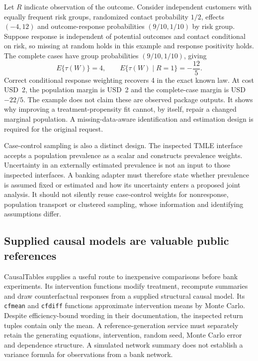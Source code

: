 Let $R$ indicate observation of the outcome. Consider independent customers
with equally frequent risk groups, randomized contact probability $1/2$,
effects $(-4,12)$ and outcome-response probabilities $(9/10,1/10)$ by risk
group. Suppose response is independent of potential outcomes and contact
conditional on risk, so missing at random holds in this example and response
positivity holds. The complete cases have group probabilities $(9/10,1/10)$,
giving
\begin{equation}
\label{exec21:effects-response}
 E\{\tau(W)\}=4,\qquad
 E\{\tau(W)\mid R=1\}=-\frac{12}{5}.
\end{equation}
Correct conditional response weighting recovers 4 in the exact known law.
At cost USD~2, the population margin is USD~2 and the complete-case margin
is USD~$-22/5$. The example does not claim these are observed package
outputs. It shows why improving a treatment-propensity fit cannot, by
itself, repair a changed marginal population. A missing-data-aware
identification and estimation design is required for the original request.
\citep{exec21_effects_reference}

Case-control sampling is also a distinct design. The inspected TMLE
interface accepts a population prevalence as a scalar and constructs
prevalence weights. Uncertainty in an externally estimated prevalence is
not an input to those inspected interfaces. A banking adapter must therefore
state whether prevalence is assumed fixed or estimated and how its
uncertainty enters a proposed joint analysis. It should not silently reuse
case-control weights for nonresponse, population transport or clustered
sampling, whose information and identifying assumptions differ.
\citep{exec21_effects_tmle}

\subsection{Supplied causal models are valuable public references}
\label{exec21:effects-scm}

CausalTables supplies a useful route to inexpensive comparisons before bank
experiments. Its intervention functions modify treatment, recompute
summaries and draw counterfactual responses from a supplied structural
causal model. Its \texttt{cfmean} and \texttt{cfdiff} functions approximate
intervention means by Monte Carlo. Despite efficiency-bound wording in
their documentation, the inspected return tuples contain only the mean.
A reference-generation service must separately retain the generating
equations, intervention, random seed, Monte Carlo error and dependence
structure. A simulated network summary does not establish a variance formula
for observations from a bank network. \citep{exec21_effects_causaltables}

